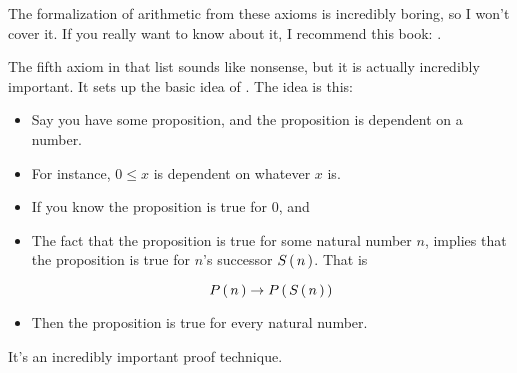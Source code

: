 The formalization of arithmetic from these axioms is incredibly boring, so I
won't cover it. If you really want to know about it, I recommend this book:
.

The fifth axiom in that list sounds like nonsense, but it is actually incredibly
important. It sets up the basic idea of . The idea
is this:

\begin{itemize}
  \item Say you have some proposition, and the proposition is dependent on a
    number.
  \item For instance, $0 \le x$ is dependent on whatever $x$ is.
  \item If you know the proposition is true for $0$, and
  \item The fact that the proposition is true for some natural number $n$,
    implies that the proposition is true for $n$'s successor $S \left(\, n \,\right)$. That is

    \begin{equation}
        P \left(\, n \,\right) \rightarrow P \left(\, S \left(\, n \,\right) \,\right)
    \end{equation}
  \item Then the proposition is true for every natural number.
\end{itemize}

It's an incredibly important proof technique.










